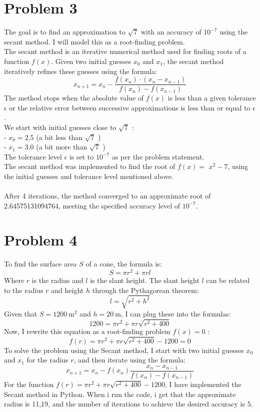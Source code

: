 \documentclass[manuscript,screen,review]{acmart}
\begin{document}
\section*{Problem 3}
The goal is to find an approximation to $\sqrt{7}$ with an accuracy of $10^{-7}$ using the secant method. I will model this as a root-finding problem.
\\
The secant method is an iterative numerical method used for finding roots of a function $f(x)$. Given two initial guesses $x_0$ and $x_1$, the secant method iteratively refines these guesses using the formula:
$$
x_{n+1}=x_n-\frac{f\left(x_n\right) \cdot\left(x_n-x_{n-1}\right)}{f\left(x_n\right)-f\left(x_{n-1}\right)}
$$
The method stops when the absolute value of $f(x)$ is less than a given tolerance $\epsilon$ or the relative error between successive approximations is less than or equal to $\epsilon$.
\\
We start with initial guesses close to $\sqrt{7}$ :
\\
- $x_0=2.5$ (a bit less than $\sqrt{7}$ )
\\
- $x_1=3.0$ (a bit more than $\sqrt{7}$ )
\\
The tolerance level $\epsilon$ is set to $10^{-7}$ as per the problem statement.
\\
The secant method was implemented to find the root of $f(x)=$ $x^2-7$, using the initial guesses and tolerance level mentioned above.
\\
\\
After 4 iterations, the method converged to an approximate root of 2.64575131094764, meeting the specified accuracy level of $10^{-7}$.

\section*{Problem 4}
To find the surface area $S$ of a cone, the formula is:
$$
S=\pi r^2+\pi r l
$$
Where $r$ is the radius and $l$ is the slant height. The slant height $l$ can be related to the radius $r$ and height $h$ through the Pythagorean theorem:
$$
l=\sqrt{r^2+h^2}
$$
Given that $S=1200 \mathrm{~m}^2$ and $h=20 \mathrm{~m}$, I can plug these into the formulas:
$$
1200=\pi r^2+\pi r \sqrt{r^2+400}
$$
Now, I rewrite this equation as a root-finding problem $f(x)=0$ :
$$
f(r)=\pi r^2+\pi r \sqrt{r^2+400}-1200=0
$$
To solve the problem using the Secant method, I start with two initial guesses $x_0$ and $x_1$ for the radius $r$, and then iterate using the formula:
$$
x_{n+1}=x_n-f\left(x_n\right) \frac{x_n-x_{n-1}}{f\left(x_n\right)-f\left(x_{n-1}\right)}
$$
For the function $f(r)=\pi r^2+\pi r \sqrt{r^2+400}-1200$, I have implemented the Secant method in Python. When i run the code, i get that the approximate radius is 11,19, and the number of iterations to achieve the desired accuracy is 5. 
\end{document}
